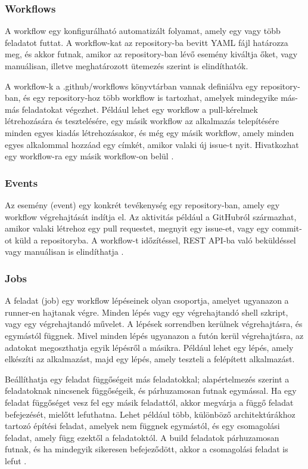 \subsubsection*{Workflows}
A workflow egy konfigurálható automatizált folyamat, amely egy vagy több feladatot futtat. A workflow-kat az repository-ba bevitt YAML fájl határozza meg, és akkor futnak, amikor az repository-ban lévő esemény kiváltja őket, vagy manuálisan, illetve meghatározott ütemezés szerint is elindíthatók.

A workflow-k a .github/workflows könyvtárban vannak definiálva egy repository-ban, és egy repository-hoz több workflow is tartozhat, amelyek mindegyike más-más feladatokat végezhet.
Például lehet egy workflow a pull-kérelmek létrehozására és tesztelésére, egy másik workflow az alkalmazás telepítésére minden egyes kiadás létrehozásakor, és még egy másik workflow, amely minden egyes alkalommal hozzáad egy címkét, amikor valaki új issue-t nyit. Hivatkozhat egy workflow-ra egy másik workflow-on belül \cite{github}.

\subsubsection*{Events}
Az esemény (event) egy konkrét tevékenység egy repository-ban, amely egy workflow végrehajtását indítja el.
Az aktivitás például a GitHubról származhat, amikor valaki létrehoz egy pull requestet, megnyit egy issue-et, vagy egy commit-ot küld a repositoryba. A workflow-t időzítéssel, REST API-ba való beküldéssel vagy manuálisan is elindíthatja \cite{github}.

\subsubsection*{Jobs}
A feladat (job) egy workflow lépéseinek olyan csoportja, amelyet ugyanazon a runner-en hajtanak végre.
Minden lépés vagy egy végrehajtandó shell szkript, vagy egy végrehajtandó művelet.
A lépések sorrendben kerülnek végrehajtásra, és egymástól függnek. Mivel minden lépés ugyanazon a futón kerül végrehajtásra, az adatokat megoszthatja egyik lépésről a másikra. Például lehet egy lépés, amely elkészíti az alkalmazást, majd egy lépés, amely teszteli a felépített alkalmazást.

Beállíthatja egy feladat függőségeit más feladatokkal; alapértelmezés szerint a feladatoknak nincsenek függőségeik, és párhuzamosan futnak egymással.
Ha egy feladat függőséget vesz fel egy másik feladattól, akkor megvárja a függő feladat befejezését, mielőtt lefuthatna. Lehet például több, különböző architektúrákhoz tartozó építési feladat, amelyek nem függnek egymástól, és egy csomagolási feladat, amely függ ezektől a feladatoktól.
A build feladatok párhuzamosan futnak, és ha mindegyik sikeresen befejeződött, akkor a csomagolási feladat is lefut \cite{github}.

